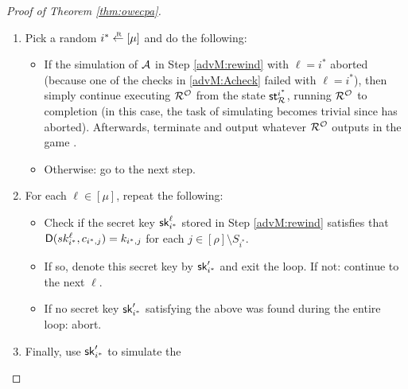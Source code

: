 \begin{proof}[Proof of Theorem \ref{thm:owecpa}]
\begin{enumerate}[itemsep=0.1cm]
\begin{itemize}[label={\textbullet},itemsep=0.1cm]
\begin{enumerate}[topsep=0.1cm,itemsep=0.1cm,ref=(\alph*)]
                    \item\label{advM:Acheck} For each \(i \ne \ell\),
                          aborting the simulation of \advA if
                          \(\Decaps(\sk_{i}^{\ell},c_{i,j}^{\ell}) \ne k_{i,j}\) for some \(j \in [\rho] \setminus S_{i}\).
                  \end{enumerate}
            \item Denote the state of \(\redR^{\oracle}\) after this point by \(\state_{\redR}^{\ell}\).
          \end{itemize}
    \item\label{advM:sample} Pick a random \(i^{*} \sampleR [\mu]\) and do the following:
        \begin{itemize}[label={\textbullet},itemsep=0.1cm]
          \item If the simulation of \(\mathcal{A}\) in Step \ref{advM:rewind} with \(\ell = i^{*}\)
                aborted (because one of the checks in \ref{advM:Acheck} failed with \(\ell = i^{*}\)),
                then simply continue executing \(\redR^{\oracle}\)
                from the state \(\state_{\redR}^{i^{*}}\), running \(\redR^{\oracle}\) to completion
                (in this case, the task of simulating \advA becomes trivial since \advA has aborted).
                Afterwards, terminate and output whatever \(\redR^{\oracle}\) outputs in the game \SICA.
          \item Otherwise: go to the next step.
        \end{itemize}
    \item\label{advM:key} For each \(\ell \in [\mu]\), repeat the following:
          \begin{itemize}[label={\textbullet},itemsep=0.1cm]
            \item Check if the secret key \(\mathsf{sk}_{i^{*}}^{\ell}\)
                  stored in Step \ref{advM:rewind} satisfies that
                  \(\mathsf{D}(sk_{i^{*}}^{\ell},c_{i^{*},j}) = k_{i^{*},j}\)
                  for each \(j \in [\rho] \setminus S_{i^{*}}\).
            \item If so, denote this secret key by \(\mathsf{sk}_{i^{*}}'\) and exit the loop.
                  If not: continue to the next \(\ell\).
            \item If no secret key \(\mathsf{sk}_{i^{*}}'\) satisfying the above
                  was found during the entire loop: abort.
          \end{itemize}
    \item\label{advM:final} Finally, use \(\mathsf{sk}_{i^{*}}'\) to simulate the

\end{enumerate}
\end{proof}
